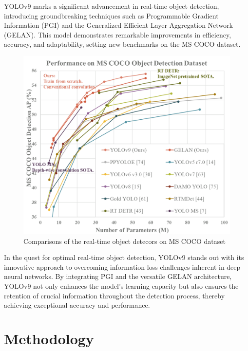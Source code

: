     YOLOv9 marks a significant advancement in real-time object detection, introducing groundbreaking techniques such as Programmable
    Gradient Information (PGI) and the Generalized Efficient Layer Aggregation Network (GELAN). This model demonstrates remarkable
    improvements in efficiency, accuracy, and adaptability, setting new benchmarks on the MS COCO dataset. \\
    \begin{figure}[H]
        \centering
        \includegraphics[width=0.8\linewidth]{img/performance_yolov9.png}
        \caption{Comparisons of the real-time object detecors on MS COCO dataset}
    \end{figure}
    In the quest for optimal real-time object detection, YOLOv9 stands out with its innovative approach to overcoming information loss
    challenges inherent in deep neural networks. By integrating PGI and the versatile GELAN architecture, YOLOv9 not only enhances the
    model's learning capacity but also ensures the retention of crucial information throughout the detection process, thereby achieving
    exceptional accuracy and performance.

\section{Methodology}
